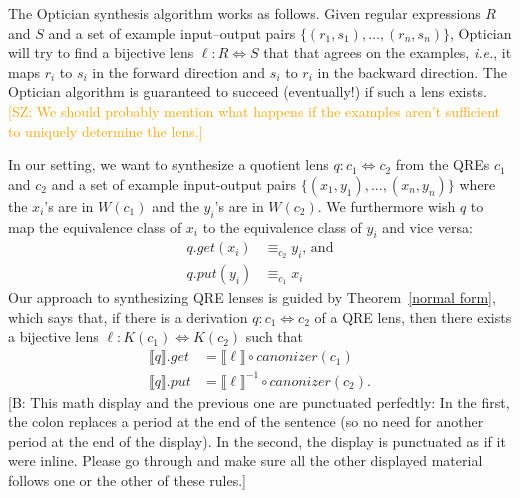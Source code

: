 \documentclass[acmsmall,review,anonymous]{acmart}
\newcommand{\FINISH}[3]{\ifdraft\textcolor{#1}{[#2: #3]}\fi}
\newcommand{\bcp}[1]{\FINISH{dkred}{B}{#1}}
\newcommand{\saz}[1]{\FINISH{orange}{SZ}{#1}}
\newcommand{\kw}[1]{\ensuremath{\mathit{#1}}}
\newcommand{\canonizer}{\ensuremath{\kw{canonizer}}}
\newcommand{\get}{\ensuremath{\kw{get}}}
\newcommand{\lput}{\ensuremath{\kw{put}}}
\begin{document}
The Optician synthesis algorithm works as follows. Given regular expressions $R$
and $S$ and a set of example input--output pairs
$\{(r_1, s_1),\allowbreak \ldots,\allowbreak (r_n, s_n)\}$, Optician will try to
find a bijective lens $\ell : R \Leftrightarrow S$ that that agrees on the
examples, \textit{i.e.}, it maps $r_i$ to $s_i$ in the forward direction and
$s_i$ to $r_i$ in the backward direction.  The Optician algorithm is guaranteed
to succeed (eventually!) if such a lens exists.    \saz{We should probably
  mention what happens if the examples aren't sufficient to uniquely
  determine the lens.}

In our setting, we want to synthesize a quotient lens $q: c_1 \Leftrightarrow
c_2$ from the QREs $c_1$ and $c_2$ and a set of example input-output pairs
$\{(x_1, y_1),\allowbreak \ldots,\allowbreak (x_n, y_n)\}$ where the $x_i$'s are
in $W(c_1)$ and the $y_i$'s are in $W(c_2)$. We furthermore wish $q$ to map the
equivalence class of $x_i$ to the equivalence class of $y_i$ and vice versa:
\begin{align*}
q.\get(x_i) &\equiv_{c_2} y_i \text{, and}\\
q.\lput(y_i) &\equiv_{c_1} x_i
\end{align*}
Our approach to synthesizing QRE lenses is guided by Theorem~\ref{normal form},
which says that, if there is a derivation $q : c_1 \Leftrightarrow c_2$ of a
QRE lens, then there exists a bijective lens $\ell : K(c_1) \Leftrightarrow
K(c_2)$ such that
\begin{align*}
\llbracket q \rrbracket.\get &= \llbracket \ell \rrbracket\circ \canonizer(c_1)\\
\llbracket q \rrbracket.\lput &= \llbracket \ell \rrbracket^{-1} \circ
\canonizer(c_2).
\end{align*}
\bcp{This math display and the previous one are punctuated perfedtly: In the
first, the colon replaces a period at the end of the sentence (so no need
for another period at the end of the display).  In the second, the display
is punctuated as if it were inline.  Please go through and make sure all the
other displayed material follows one or the other of these rules.}
\end{document}
